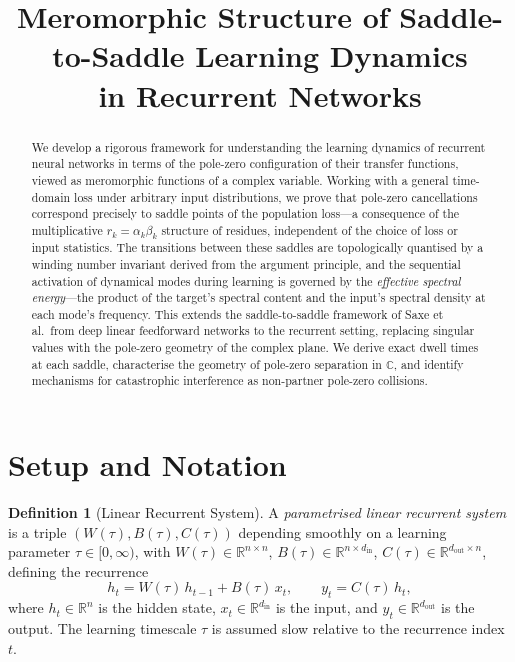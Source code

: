\documentclass[11pt,a4paper]{article}
\title{Meromorphic Structure of Saddle-to-Saddle Learning Dynamics\\in Recurrent Networks}
\author{}
\date{}
\theoremstyle{definition}
\newtheorem{definition}[theorem]{Definition}
\newcommand{\C}{\mathbb{C}}
\newcommand{\R}{\mathbb{R}}
\begin{document}
\maketitle

\begin{abstract}
We develop a rigorous framework for understanding the learning dynamics of
recurrent neural networks in terms of the pole-zero configuration of their
transfer functions, viewed as meromorphic functions of a complex variable.
Working with a general time-domain loss under arbitrary input distributions,
we prove that pole-zero cancellations correspond precisely to saddle points
of the population loss---a consequence of the multiplicative
$r_k = \alpha_k\beta_k$ structure of residues, independent of the choice
of loss or input statistics. The transitions between these saddles are
topologically quantised by a winding number invariant derived from the
argument principle, and the sequential activation of dynamical modes during
learning is governed by the \emph{effective spectral energy}---the product
of the target's spectral content and the input's spectral density at each
mode's frequency. This extends the saddle-to-saddle framework of
Saxe et al.\ from deep linear feedforward networks to the recurrent
setting, replacing singular values with the pole-zero geometry of the
complex plane. We derive exact dwell times at each saddle, characterise
the geometry of pole-zero separation in $\C$, and identify mechanisms
for catastrophic interference as non-partner pole-zero collisions.
\end{abstract}

\tableofcontents

\section{Setup and Notation}\label{sec:setup}

\begin{definition}[Linear Recurrent System]\label{def:lrs}
A \emph{parametrised linear recurrent system} is a triple
$(W(\tau), B(\tau), C(\tau))$ depending smoothly on a learning
parameter $\tau \in [0,\infty)$, with $W(\tau) \in \R^{n \times n}$,
$B(\tau) \in \R^{n \times d_{\mathrm{in}}}$,
$C(\tau) \in \R^{d_{\mathrm{out}} \times n}$, defining the recurrence
\begin{equation}\label{eq:recurrence}
  h_t = W(\tau)\, h_{t-1} + B(\tau)\, x_t, \qquad
  y_t = C(\tau)\, h_t,
\end{equation}
where $h_t \in \R^n$ is the hidden state,
$x_t \in \R^{d_{\mathrm{in}}}$ is the input, and
$y_t \in \R^{d_{\mathrm{out}}}$ is the output.
The learning timescale $\tau$ is assumed slow relative to the
recurrence index $t$.
\end{definition}
\end{document}
